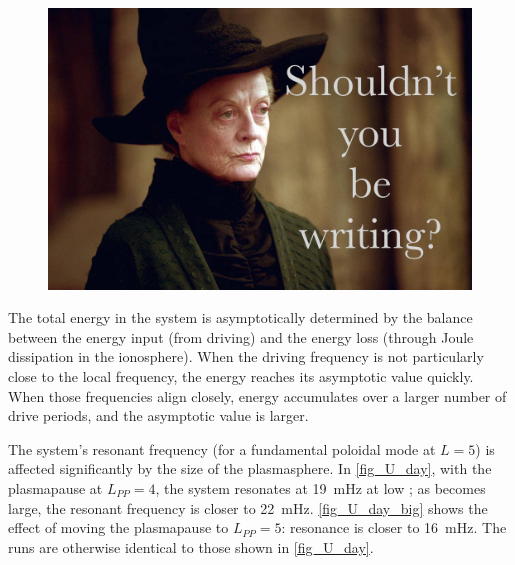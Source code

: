 
\begin{figure}[!htb]
    \centering
    \includegraphics[width=\textwidth]{figures/placeholder.jpg}
    \caption[Poloidal and Toroidal Energy: Quiet Day, No Hall Conductivity]{
    }
    \label{fig_U_day_nosigh}
\end{figure}

The total energy in the system is asymptotically determined by the balance between the energy input (from driving) and the energy loss (through Joule dissipation in the ionosphere). When the driving frequency is not particularly close to the local \Alfven frequency, the energy reaches its asymptotic value quickly. When those frequencies align closely, energy accumulates over a larger number of drive periods, and the asymptotic value is larger. 

The system's resonant frequency (for a fundamental poloidal mode at $L=5$) is affected significantly by the size of the plasmasphere. In \cref{fig_U_day}, with the plasmapause at $L_{PP}=4$, the system resonates at \SI{19}{\mHz} at low \azm; as \azm becomes large, the resonant frequency is closer to \SI{22}{\mHz}. \cref{fig_U_day_big} shows the effect of moving the plasmapause to $L_{PP}=5$: resonance is closer to \SI{16}{\mHz}. The runs are otherwise identical to those shown in \cref{fig_U_day}. 

